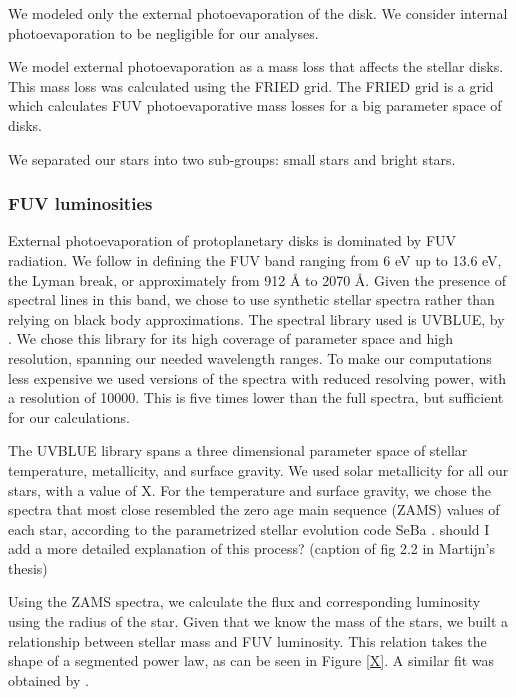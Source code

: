 \documentclass[fleqn,usenatbib]{mnras}
\newcommand\note[1]{{\colorbox{yellow!60}{\color{magenta}#1}}}
\begin{document}
We modeled only the external photoevaporation of the disk. We consider internal photoevaporation to be negligible for our analyses.

We model external photoevaporation as a mass loss that affects the stellar disks. This mass loss was calculated using the FRIED grid. The FRIED grid is a grid which calculates FUV photoevaporative mass losses for a big parameter space of disks. 

We separated our stars into two sub-groups: small stars and bright stars. 

\subsubsection{FUV luminosities}
External photoevaporation of protoplanetary disks is dominated by FUV radiation. We follow \citet{adams2004} in defining the FUV band ranging from 6 eV up to 13.6 eV, the Lyman break, or approximately from 912 Å to 2070 Å. Given the presence of spectral lines in this band, we chose to use synthetic stellar spectra rather than relying on black body approximations. The spectral library used is UVBLUE, by \citet{rodriguez-merino2005}. We chose this library for its high coverage of parameter space and high resolution, spanning our needed wavelength ranges. To make our computations less expensive we used versions of the spectra with reduced resolving power, with a resolution of 10000. This is five times lower than the full spectra, but sufficient for our calculations. 

The UVBLUE library spans a three dimensional parameter space of stellar temperature, metallicity, and surface gravity. We used solar metallicity for all our stars, with a value of \note{X}. For the temperature and surface gravity, we chose the spectra that most close resembled the zero age main sequence (ZAMS) values of each star, according to the parametrized stellar evolution code SeBa \citep{portegieszwart1996, toonen2012}. \note{should I add a more detailed explanation of this process? (caption of fig 2.2 in Martijn's thesis)}

Using the ZAMS spectra, we calculate the flux and corresponding luminosity using the radius of the star. Given that we know the mass of the stars, we built a relationship between stellar mass and FUV luminosity. This relation takes the shape of a segmented power law, as can be seen in Figure \ref{X}. A similar fit was obtained by \citet{parravano2003}.

\end{document}
